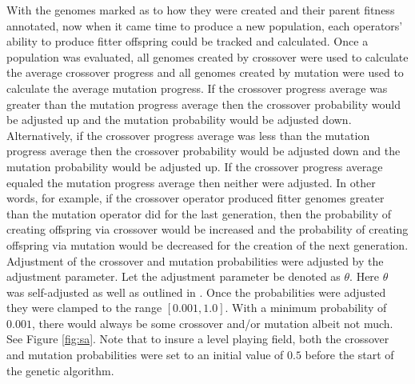 \documentclass[a4paper,10pt]{article}
\begin{document}
With the genomes marked as to how they were created and their parent fitness annotated, now when it came time to produce a new population, each operators' ability to produce fitter offspring could be tracked and calculated. Once a population was evaluated, all genomes created by crossover were used to calculate the average crossover progress and all genomes created by mutation were used to calculate the average mutation progress. If the crossover progress average was greater than the mutation progress average then the crossover probability would be adjusted up and the mutation probability would be adjusted down. Alternatively, if the crossover progress average was less than the mutation progress average then the crossover probability would be adjusted down and the mutation probability would be adjusted up. If the crossover progress average equaled the mutation progress average then neither were adjusted. In other words, for example, if the crossover operator produced fitter genomes greater than the mutation operator did for the last generation, then the probability of creating offspring via crossover would be increased and the probability of creating offspring via mutation would be decreased for the creation of the next generation. Adjustment of the crossover and mutation probabilities were adjusted by the adjustment parameter. Let the adjustment parameter be denoted as $\theta$. Here $\theta$ was self-adjusted as well as outlined in \cite{self_adapt}. Once the probabilities were adjusted they were clamped to the range $[0.001,1.0]$. With a minimum probability of $0.001$, there would always be some crossover and/or mutation albeit not much. See Figure \ref{fig:sa}. Note that to insure a level playing field, both the crossover and mutation probabilities were set to an initial value of $0.5$ before the start of the genetic algorithm.
\end{document}

